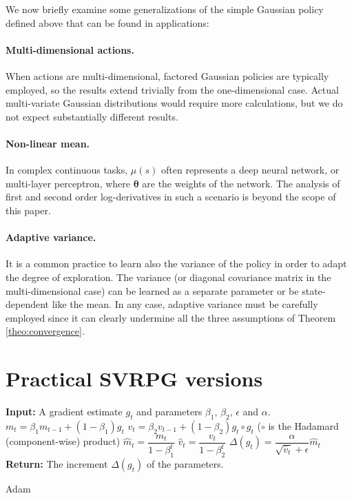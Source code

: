 \documentclass{article}
\theoremstyle{remark}
\theoremstyle{definition}
\newcommand{\vtheta}{\boldsymbol{\theta}}
\begin{document}
We now briefly examine some generalizations of the simple Gaussian policy defined above that can be found in applications:

\paragraph{Multi-dimensional actions.}
When actions are multi-dimensional, factored Gaussian policies are typically employed, so the results extend trivially from the one-dimensional case. Actual multi-variate Gaussian distributions would require more calculations, but we do not expect substantially different results.

\paragraph{Non-linear mean.}
In complex continuous tasks, $\mu(s)$ often represents a deep neural network, or multi-layer perceptron, where $\vtheta$ are the weights of the network. The analysis of first and second order log-derivatives in such a scenario is beyond the scope of this paper.

\paragraph{Adaptive variance.}
It is a common practice to learn also the variance of the policy in order to adapt the degree of exploration. The variance (or diagonal covariance matrix in the multi-dimensional case) can be learned as a separate parameter or be state-dependent like the mean. In any case, adaptive variance must be carefully employed since it can clearly undermine all the three assumptions of Theorem \ref{theo:convergence}.

\section{Practical SVRPG versions}\label{app:practicalsvrpg}
\begin{algorithm}[h]
        \begin{algorithmic}
        \STATE \textbf{Input:} A gradient estimate $g_t$ and parameters $\beta_1$, $\beta_2$, $\epsilon$ and $\alpha$.
        \STATE $m_t = \beta_1 m_{t-1} + (1 - \beta_1) g_t$
        \STATE $v_t = \beta_2 v_{t-1} + (1 - \beta_2) g_t \circ g_t$ ($\circ$ is the Hadamard (component-wise) product)
        \STATE $\hat{m}_t = \dfrac{m_t}{1 - \beta^t_1}$
        \STATE $\hat{v}_t = \dfrac{v_t}{1 - \beta^t_2}$
        \STATE $\Delta(g_t) = \dfrac{\alpha}{\sqrt{\hat{v}_t} + \epsilon} \hat{m}_t$
        \STATE \textbf{Return:} The increment $\Delta(g_t)$  of the parameters.
\end{algorithmic}
 \caption{
 \label{A:adam}
 Adam}
\end{algorithm}
\end{document}
